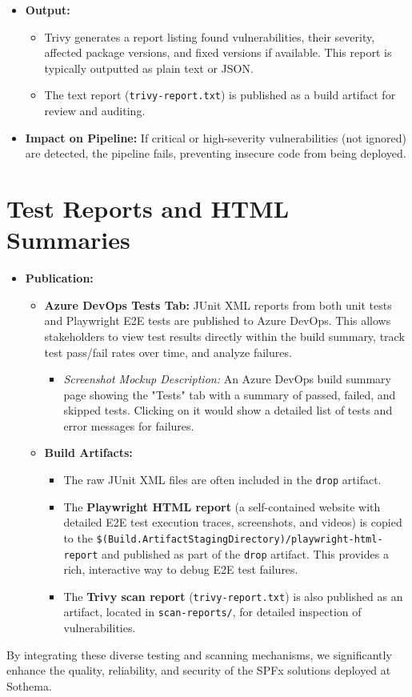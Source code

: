 \begin{itemize}
\begin{itemize}
\begin{itemize}
        \end{itemize}
    \end{itemize}
    \item \textbf{Output:}
    \begin{itemize}
        \item Trivy generates a report listing found vulnerabilities, their severity, affected package versions, and fixed versions if available. This report is typically outputted as plain text or JSON.
        \item The text report (\texttt{trivy-report.txt}) is published as a build artifact for review and auditing.
    \end{itemize}
    \item \textbf{Impact on Pipeline:} If critical or high-severity vulnerabilities (not ignored) are detected, the pipeline fails, preventing insecure code from being deployed.
\end{itemize}

\section{Test Reports and HTML Summaries}
\label{sec:TestReportsHTMLSummaries}

\begin{itemize}
    \item \textbf{Publication:}
    \begin{itemize}
        \item \textbf{Azure DevOps Tests Tab:} JUnit XML reports from both unit tests and Playwright E2E tests are published to Azure DevOps. This allows stakeholders to view test results directly within the build summary, track test pass/fail rates over time, and analyze failures.
        \begin{itemize}
            \item \textit{Screenshot Mockup Description:} An Azure DevOps build summary page showing the "Tests" tab with a summary of passed, failed, and skipped tests. Clicking on it would show a detailed list of tests and error messages for failures.
        \end{itemize}
        \item \textbf{Build Artifacts:}
        \begin{itemize}
            \item The raw JUnit XML files are often included in the \texttt{drop} artifact.
            \item The \textbf{Playwright HTML report} (a self-contained website with detailed E2E test execution traces, screenshots, and videos) is copied to the \texttt{\$(Build.ArtifactStagingDirectory)/playwright-html-report} and published as part of the \texttt{drop} artifact. This provides a rich, interactive way to debug E2E test failures.
            \item The \textbf{Trivy scan report} (\texttt{trivy-report.txt}) is also published as an artifact, located in \texttt{scan-reports/}, for detailed inspection of vulnerabilities.
        \end{itemize}
    \end{itemize}
\end{itemize}

By integrating these diverse testing and scanning mechanisms, we significantly enhance the quality, reliability, and security of the SPFx solutions deployed at Sothema.
